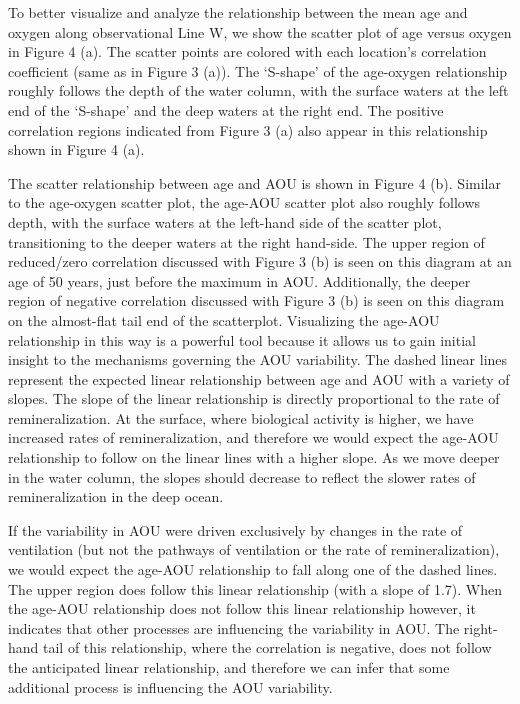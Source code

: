 \documentclass{ametsoc}
\begin{document}
To better visualize and analyze the relationship between the mean age and oxygen along observational Line W, we show the scatter plot of age versus oxygen in Figure 4 (a). The scatter points are colored with each location’s correlation coefficient (same as in Figure 3 (a)). The `S-shape’ of the age-oxygen relationship roughly follows the depth of the water column, with the surface waters at the left end of the `S-shape’ and the deep waters at the right end. The positive correlation regions indicated from Figure 3 (a) also appear in this relationship shown in Figure 4 (a).

The scatter relationship between age and AOU is shown in Figure 4 (b).  Similar to the age-oxygen scatter plot, the age-AOU scatter plot also roughly follows depth, with the surface waters at the left-hand side of the scatter plot, transitioning to the deeper waters at the right hand-side. The upper region of reduced/zero correlation discussed with Figure 3 (b) is seen on this diagram at an age of 50 years, just before the maximum in AOU. Additionally, the deeper region of negative correlation discussed with Figure 3 (b) is seen on this diagram on the almost-flat tail end of the scatterplot. Visualizing the age-AOU relationship in this way is a powerful tool because it allows us to gain initial insight to the mechanisms governing the AOU variability. The dashed linear lines represent the expected linear relationship between age and AOU with a variety of slopes. The slope of the linear relationship is directly proportional to the rate of remineralization. At the surface, where biological activity is higher, we have increased rates of remineralization, and therefore we would expect the age-AOU relationship to follow on the linear lines with a higher slope. As we move deeper in the water column, the slopes should decrease to reflect the slower rates of remineralization in the deep ocean.

If the variability in AOU were driven exclusively by changes in the rate of ventilation (but not the pathways of ventilation or the rate of remineralization), we would expect the age-AOU relationship to fall along one of the dashed lines.  The upper region does follow this linear relationship (with a slope of 1.7). When the age-AOU relationship does not follow this linear relationship however, it indicates that other processes are influencing the variability in AOU. The right-hand tail of this relationship, where the correlation is negative, does not follow the anticipated linear relationship, and therefore we can infer that some additional process is influencing the AOU variability.
\end{document}
